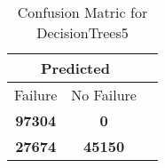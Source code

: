\begin{table}[] 
\caption{Confusion Matric for DecisionTrees5} 
\label{Table: Prediction Accuracy-DMDDecisionTrees5OnlySunEKF-ignoreReflectionperfectNoFailurePrediction-Reflection} 
\centering 
\begin{tabular} 
 {@{}ccc@{}} 
\toprule 
\multicolumn{2}{c}{\textbf{Predicted}}
 \\ \midrule 
\multicolumn{1}{|c|}{Failure} & 
\multicolumn{1}{c|}{No Failure}
 \\ \midrule 
\multicolumn{1}{|c|}{\color{green}\textbf{97304}} & 
\multicolumn{1}{c|}{\color{red}\textbf{0}}
 \\ \midrule 
\multicolumn{1}{|c|}{\color{red}\textbf{27674}} & 
\multicolumn{1}{c|}{\color{green}\textbf{45150}}
 \\ \bottomrule 
\end{tabular} 
\end{table} 
